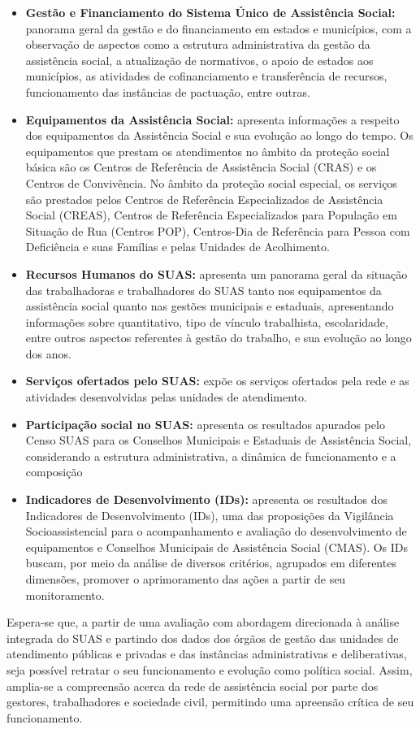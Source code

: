 \documentclass[brazilian]{report}
\begin{document}
\begin{itemize}
  \item 
\textbf{Gestão e Financiamento do Sistema Único de Assistência Social:} panorama geral da gestão e do financiamento em estados e municípios, com a observação de aspectos como a estrutura administrativa da gestão da assistência social, a atualização de normativos, o apoio de estados aos municípios, as atividades de cofinanciamento e transferência de recursos, funcionamento das instâncias de pactuação, entre outras.
  \item 
\textbf{Equipamentos da Assistência Social:} apresenta informações a respeito dos equipamentos da Assistência Social e sua evolução ao longo do tempo. Os equipamentos que prestam os atendimentos no âmbito da proteção social básica são os Centros de Referência de Assistência Social (CRAS) e os Centros de Convivência. No âmbito da proteção social especial, os serviços são prestados pelos Centros de Referência Especializados de Assistência Social (CREAS), Centros de Referência Especializados para População em Situação de Rua (Centros POP), Centros-Dia de Referência para Pessoa com Deficiência e suas Famílias e pelas Unidades de Acolhimento.
  \item 
\textbf{Recursos Humanos do SUAS:} apresenta um panorama geral da situação das trabalhadoras e trabalhadores do SUAS tanto nos equipamentos da assistência social quanto nas gestões municipais e estaduais, apresentando informações sobre quantitativo, tipo de vínculo trabalhista, escolaridade, entre outros aspectos referentes à gestão do trabalho, e sua evolução ao longo dos anos.
  \item 
\textbf{Serviços ofertados pelo SUAS:} expõe os serviços ofertados pela rede e as atividades desenvolvidas pelas unidades de atendimento.
  \item 
\textbf{Participação social no SUAS:} apresenta os resultados apurados pelo Censo SUAS para os Conselhos Municipais e Estaduais de Assistência Social, considerando a estrutura administrativa, a dinâmica de funcionamento e a composição
  \item 
\textbf{Indicadores de Desenvolvimento (IDs):} apresenta os resultados dos Indicadores de Desenvolvimento (IDs), uma das proposições da Vigilância Socioassistencial para o acompanhamento e avaliação do desenvolvimento de equipamentos e Conselhos Municipais de Assistência Social (CMAS). Os IDs buscam, por meio da análise de diversos critérios, agrupados em diferentes dimensões, promover o aprimoramento das ações a partir de seu monitoramento.
\end{itemize}

Espera-se que, a partir de uma avaliação com abordagem direcionada à análise integrada do SUAS e partindo dos dados dos órgãos de gestão das unidades de atendimento públicas e privadas e das instâncias administrativas e deliberativas, seja possível retratar o seu funcionamento e evolução como política social. Assim, amplia-se a compreensão acerca da rede de assistência social por parte dos gestores, trabalhadores e sociedade civil, permitindo uma apreensão crítica de seu funcionamento.
\end{document}
